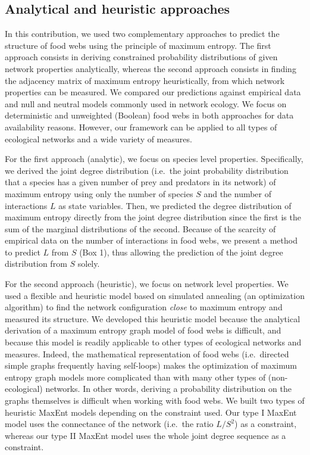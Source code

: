 \documentclass[11pt]{article}
\begin{document}
\hypertarget{analytical-and-heuristic-approaches}{%
\subsection{Analytical and heuristic
approaches}\label{analytical-and-heuristic-approaches}}

In this contribution, we used two complementary approaches to predict
the structure of food webs using the principle of maximum entropy. The
first approach consists in deriving constrained probability
distributions of given network properties analytically, whereas the
second approach consists in finding the adjacency matrix of maximum
entropy heuristically, from which network properties can be measured. We
compared our predictions against empirical data and null and neutral
models commonly used in network ecology. We focus on deterministic and
unweighted (Boolean) food webs in both approaches for data availability
reasons. However, our framework can be applied to all types of
ecological networks and a wide variety of measures.

For the first approach (analytic), we focus on species level properties.
Specifically, we derived the joint degree distribution (i.e.~the joint
probability distribution that a species has a given number of prey and
predators in its network) of maximum entropy using only the number of
species \(S\) and the number of interactions \(L\) as state variables.
Then, we predicted the degree distribution of maximum entropy directly
from the joint degree distribution since the first is the sum of the
marginal distributions of the second. Because of the scarcity of
empirical data on the number of interactions in food webs, we present a
method to predict \(L\) from \(S\) (Box 1), thus allowing the prediction
of the joint degree distribution from \(S\) solely.

For the second approach (heuristic), we focus on network level
properties. We used a flexible and heuristic model based on simulated
annealing (an optimization algorithm) to find the network configuration
\emph{close} to maximum entropy and measured its structure. We developed
this heuristic model because the analytical derivation of a maximum
entropy graph model of food webs is difficult, and because this model is
readily applicable to other types of ecological networks and measures.
Indeed, the mathematical representation of food webs (i.e.~directed
simple graphs frequently having self-loops) makes the optimization of
maximum entropy graph models more complicated than with many other types
of (non-ecological) networks. In other words, deriving a probability
distribution on the graphs themselves is difficult when working with
food webs. We built two types of heuristic MaxEnt models depending on
the constraint used. Our type I MaxEnt model uses the connectance of the
network (i.e.~the ratio \(L/S^2\)) as a constraint, whereas our type II
MaxEnt model uses the whole joint degree sequence as a constraint.
\end{document}
